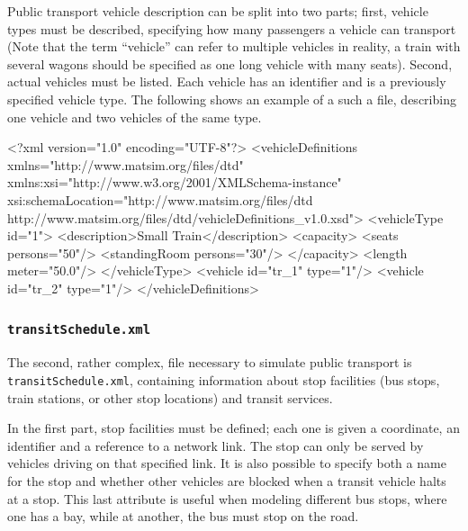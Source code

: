 Public transport vehicle description can be split into two parts; first, vehicle types must be described, specifying how many passengers a vehicle can transport (Note that the term ``vehicle'' can refer to multiple vehicles in reality, \eg a train with several wagons should be specified as one long vehicle with many seats). Second, actual vehicles must be listed. Each vehicle has an identifier and is a previously specified vehicle type. The following shows an example of a such a file, describing one vehicle  and two vehicles of the same type. 

\begin{xml}
<?xml version="1.0" encoding="UTF-8"?> 
<vehicleDefinitions xmlns="http://www.matsim.org/files/dtd" 
       xmlns:xsi="http://www.w3.org/2001/XMLSchema-instance" 
       xsi:schemaLocation="http://www.matsim.org/files/dtd 
			  http://www.matsim.org/files/dtd/vehicleDefinitions_v1.0.xsd"> 
	<vehicleType id="1"> 
      <description>Small Train</description> 
      <capacity> 
         <seats persons="50"/> 
         <standingRoom persons="30"/> 
      </capacity> 
      <length meter="50.0"/> 
   </vehicleType> 
   <vehicle id="tr_1" type="1"/> 
   <vehicle id="tr_2" type="1"/> 
</vehicleDefinitions>
\end{xml}

\subsubsection{\lstinline|transitSchedule.xml|}
\label{sec:inputdata:transitschedule}
The second, rather complex, file necessary to simulate public transport is \lstinline|transitSchedule.xml|, containing information about stop facilities (bus stops, train stations, or other stop locations) and transit services.

In the first part, stop facilities must be defined; each one is given a coordinate, an identifier and a reference to a network link. The stop can only be served by vehicles driving on that specified link. It is also possible to specify both a name for the stop and whether other vehicles are blocked when a transit vehicle halts at a stop. This last attribute is useful when modeling \eg different bus stops, where one has a bay, while at another, the bus must stop on the road.

